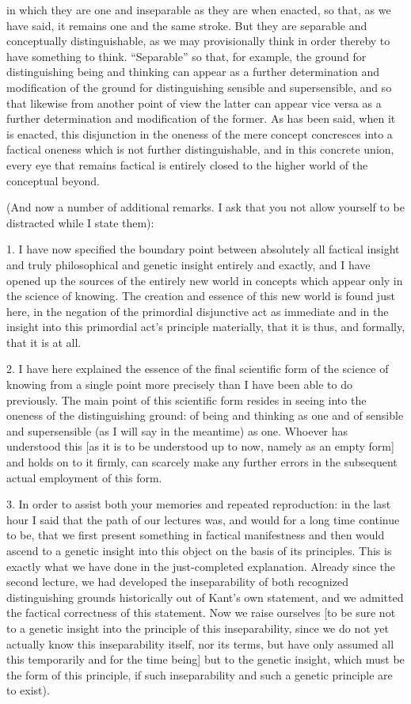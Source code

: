 in which they are one and inseparable
as they are when enacted, so that, as we have said,
it remains one and the same stroke.
But they are separable and conceptually distinguishable,
as we may provisionally think in order thereby
to have something to think.
“Separable” so that, for example, the ground for
distinguishing being and thinking can appear as
a further determination and modification of
the ground for distinguishing sensible and supersensible,
and so that likewise from another point of view
the latter can appear vice versa as
a further determination and modification of the former.
As has been said, when it is enacted,
this disjunction in the oneness of the mere concept
concresces into a factical oneness which is not further distinguishable,
and in this concrete union, every eye that remains factical is
entirely closed to the higher world of the conceptual beyond.

(And now a number of additional remarks.
I ask that you not allow yourself to be
distracted while I state them):

1. I have now specified the boundary point
between absolutely all factical insight
and truly philosophical and genetic insight
entirely and exactly,
and I have opened up the sources of
the entirely new world in concepts
which appear only in the science of knowing.
The creation and essence of this new world is found just here,
in the negation of the primordial disjunctive act as immediate
and in the insight into this primordial act’s principle
materially, that it is thus, and formally, that it is at all.

2. I have here explained the essence of
the final scientific form of the science of knowing
from a single point more precisely
than I have been able to do previously.
The main point of this scientific form
resides in seeing into the oneness
of the distinguishing ground:
of being and thinking as one
and of sensible and supersensible
(as I will say in the meantime) as one.
Whoever has understood this
[as it is to be understood up to now,
namely as an empty form]
and holds on to it firmly,
can scarcely make any further errors
in the subsequent actual employment of this form.

3. In order to assist both your memories and repeated reproduction:
in the last hour I said that the path of our lectures was,
and would for a long time continue to be,
that we first present something
in factical manifestness
and then would ascend to
a genetic insight into this object
on the basis of its principles.
This is exactly what we have done
in the just-completed explanation.
Already since the second lecture,
we had developed the inseparability of
both recognized distinguishing grounds
historically out of Kant’s own statement,
and we admitted the factical correctness
of this statement.
Now we raise ourselves
[to be sure not to a genetic insight
into the principle of this inseparability,
since we do not yet actually know
this inseparability itself, nor its terms,
but have only assumed all this temporarily
and for the time being]
but to the genetic insight,
which must be the form of this principle,
if such inseparability and
such a genetic principle are to exist).

